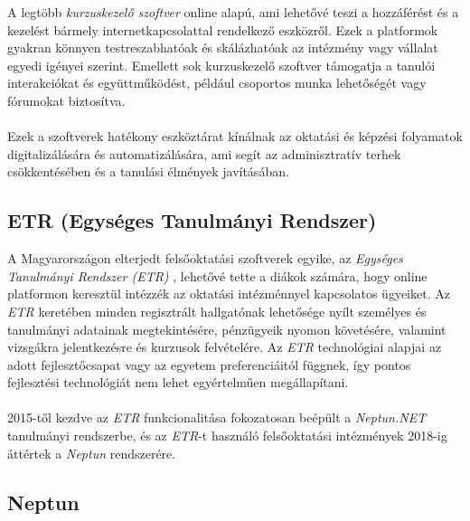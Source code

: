 A legtöbb \textit{kurzuskezelő szoftver} online alapú, ami lehetővé teszi a hozzáférést és a kezelést bármely internetkapcsolattal rendelkező eszközről. Ezek a platformok gyakran könnyen testreszabhatóak és skálázhatóak az intézmény vagy vállalat egyedi igényei szerint. Emellett sok kurzuskezelő szoftver támogatja a tanulói interakciókat és együttműködést, például csoportos munka lehetőségét vagy fórumokat biztosítva.\\
\\
Ezek a szoftverek hatékony eszköztárat kínálnak az oktatási és képzési folyamatok digitalizálására és automatizálására, ami segít az adminisztratív terhek csökkentésében és a tanulási élmények javításában.

\subsection{ETR (Egységes Tanulmányi Rendszer) }

A Magyarországon elterjedt felsőoktatási szoftverek egyike, az \textit{Egységes Tanulmányi Rendszer (ETR)} \cite{etr}, lehetővé tette a diákok számára, hogy online platformon keresztül intézzék az oktatási intézménnyel kapcsolatos ügyeiket. Az \textit{ETR} keretében minden regisztrált hallgatónak lehetősége nyílt személyes és tanulmányi adatainak megtekintésére, pénzügyeik nyomon követésére, valamint vizsgákra jelentkezésre és kurzusok felvételére. Az \textit{ETR} technológiai alapjai az adott fejlesztőcsapat vagy az egyetem preferenciáitól függnek, így pontos fejlesztési technológiát nem lehet egyértelműen megállapítani.\\
\\
2015-től kezdve az \textit{ETR} funkcionalitása fokozatosan beépült a \textit{Neptun.NET} \cite{neptun} tanulmányi rendszerbe, és az \textit{ETR}-t használó felsőoktatási intézmények 2018-ig áttértek a \textit{Neptun} rendszerére.

\subsection{Neptun}

